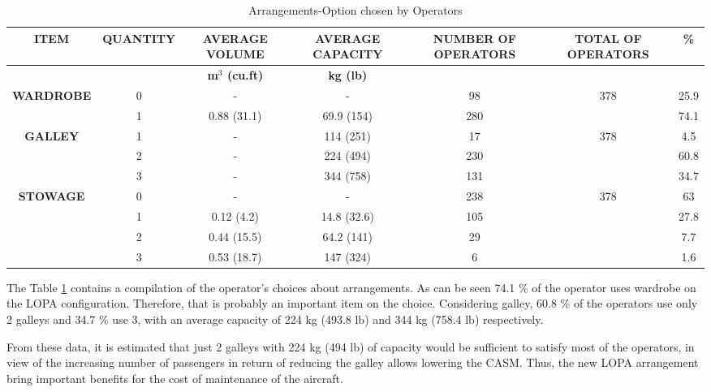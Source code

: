 \begin{table}[htbp]
  \centering
  \tiny
  \caption{Arrangements-Option chosen by Operators}
    \begin{tabular}{rcccccc}
    \toprule
    \multicolumn{1}{c}{\multirow{2}[2]{*}{\textbf{ITEM}}} & \multirow{2}[2]{*}{\textbf{QUANTITY}} & \textbf{AVERAGE VOLUME} & \textbf{AVERAGE CAPACITY} & \multirow{2}[2]{*}{\textbf{NUMBER OF OPERATORS}} & \multirow{2}[2]{*}{\textbf{TOTAL OF OPERATORS}} & \multirow{2}[2]{*}{\textbf{\%}} \\
    \midrule
    \multicolumn{1}{c}{} &       & \textbf{m$^{3}$ (cu.ft)} & \textbf{kg (lb)} &       &       &  \\
    \multicolumn{1}{c}{\textbf{WARDROBE}} & 0     & -     & -     & 98    & 378   & 25.9 \\
    \multicolumn{1}{c}{\textbf{}} & 1     & 0.88 (31.1) & 69.9 (154) & 280   &       & 74.1 \\
    \multicolumn{1}{c}{\textbf{GALLEY}} & 1     & -     & 114  (251) & 17    & 378   & 4.5 \\
    \multicolumn{1}{c}{\textbf{}} & 2     & -     & 224 (494) & 230   &       & 60.8 \\
    \multicolumn{1}{c}{\textbf{}} & 3     & -     & 344 (758) & 131   &       & 34.7 \\
    \multicolumn{1}{c}{\textbf{STOWAGE}} & 0     & -     & -     & 238   & 378   & 63 \\
    \textbf{} & 1     & 0.12 (4.2) & 14.8 (32.6) & 105   &       & 27.8 \\
    \textbf{} & 2     & 0.44 (15.5) & 64.2 (141) & 29    &       & 7.7 \\
    \textbf{} & 3     & 0.53 (18.7) & 147 (324) & 6     &       & 1.6 \\
    \bottomrule
    \end{tabular}%
  \label{tab:OpratorArrangementOption}%
\end{table}%



The Table \ref{tab:OpratorArrangementOption} contains a compilation of the operator's choices about arrangements. As can be seen 74.1 \% of the operator uses wardrobe on the LOPA configuration. Therefore, that is probably an important item on the choice. Considering galley, 60.8 \% of the operators use only 2 galleys and 34.7 \% use 3, with an average capacity of 224 kg (493.8 lb) and 344 kg (758.4 lb) respectively.


From these data, it is estimated that just 2 galleys with 224 kg (494 lb) of capacity would be sufficient to satisfy most of the operators, in view of the increasing number of passengers in return of reducing the galley allows lowering the CASM. Thus, the new LOPA arrangement bring important benefits for the cost of maintenance of the aircraft.


